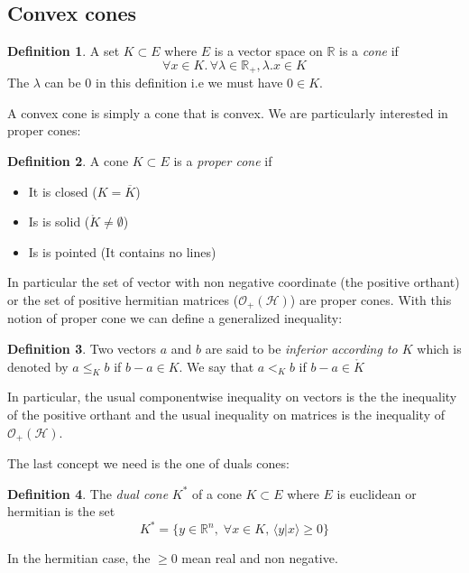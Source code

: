 \documentclass[10pt,a4paper]{report}
\theoremstyle{plain}
\theoremstyle{definition}
\newtheorem{defn}{Definition}[chapter]
\theoremstyle{remark}
\newcommand{\R}{\ensuremath{\mathbb{R}}}
\newcommand{\braket}[2]{\langle#1|#2\rangle}
\renewcommand{\geq}{\geqslant}
\renewcommand{\leq}{\leqslant}
\begin{document}
\subsection{Convex cones}

\begin{defn}
  A set $K \subset E$ where $E$ is a vector space on $\R$ is a \emph{cone} if
  \[\forall x \in K.\, \forall \lambda \in \R_+, \lambda.x  \in K\]
  The $\lambda$ can be 0 in this definition i.e we must have $0 \in K$.
\end{defn}

A convex cone is simply a cone that is convex. We are particularly interested in
proper cones:

\begin{defn}
  A cone $K \subset E$ is a \emph{proper cone} if
  \begin{itemize}
    \item It is closed ($K = \overline K$)
    \item Is is solid ($ \mathring K \neq \emptyset$)
    \item Is is pointed (It contains no lines)
  \end{itemize}
\end{defn}

In particular the set of vector with non negative coordinate (the positive orthant) or the set of
positive hermitian matrices ($\mathcal{O}_+(\mathcal{H})$) are proper cones.
With this notion of proper cone we can define a
generalized inequality:

\begin{defn}
  Two vectors $a$ and $b$ are said to be \emph{inferior according to $K$} which is denoted by $a
  \leq_K b$ if $b - a \in K$. We say that $a <_K b$ if $b - a \in \mathring K$
\end{defn}

In particular, the usual componentwise inequality on vectors is the the
inequality of the positive orthant and the usual inequality on matrices is the
inequality of $\mathcal{O}_+(\mathcal{H})$.

The last concept we need is the one of duals cones:

\begin{defn}
  The \emph{dual cone} $K^*$ of a cone $K \subset E$ where $E$ is euclidean or
  hermitian is the set
  \[ K^* = \{y \in \R^n,\; \forall x \in K,\, \braket y x \geq 0\}\]

  In the hermitian case, the $\geq 0$ mean real and non negative.
\end{defn}
\end{document}
